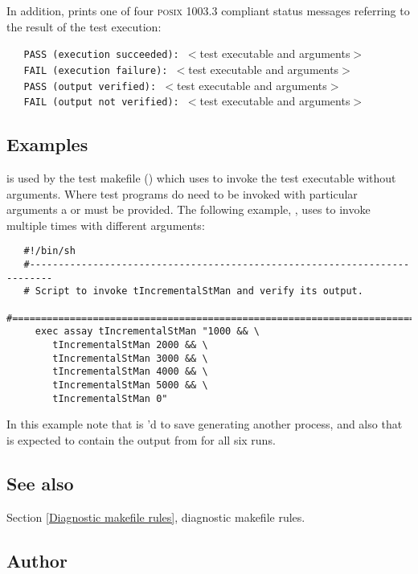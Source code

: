 \noindent
In addition,  prints one of four \textsc{posix 1003.3} compliant
status messages referring to the result of the test execution:

\noindent
\verb+   PASS (execution succeeded): +$<$test executable and arguments$>$ \\
\verb+   FAIL (execution failure): +$<$test executable and arguments$>$ \\
\verb+   PASS (output verified): +$<$test executable and arguments$>$ \\
\verb+   FAIL (output not verified): +$<$test executable and arguments$>$
 
\subsection*{Examples}

 is used by the test makefile () which
uses  to invoke the test executable without arguments.  Where test
programs do need to be invoked with particular arguments a
 or   must
be provided.  The following example, , uses
 to invoke  multiple times with different
arguments:

\begin{verbatim}
   #!/bin/sh
   #--------------------------------------------------------------------------
   # Script to invoke tIncrementalStMan and verify its output.
   #==========================================================================
     exec assay tIncrementalStMan "1000 && \
        tIncrementalStMan 2000 && \
        tIncrementalStMan 3000 && \
        tIncrementalStMan 4000 && \
        tIncrementalStMan 5000 && \
        tIncrementalStMan 0"
\end{verbatim}

\noindent
In this example note that  is 'd to save generating
another process, and also that  is expected to
contain the output from  for all six runs.
 
\subsection*{See also}
 
Section \ref{Diagnostic makefile rules}, diagnostic makefile rules.
 
\subsection*{Author}
 
